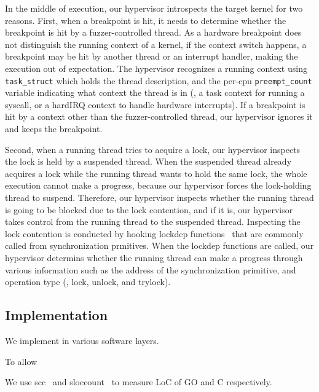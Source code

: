 %
%
In the middle of execution, our hypervisor introspects the target
kernel for two reasons.
%
First, when a breakpoint is hit, it needs to determine whether the
breakpoint is hit by a fuzzer-controlled thread.
%
As a hardware breakpoint does not distinguish the running context of a
kernel, if the context switch happens, a breakpoint may be hit by
another thread or an interrupt handler, making the execution out of
expectation.
%
The hypervisor recognizes a running context using \texttt{task_struct}
which holds the thread description, and the per-cpu
\texttt{preempt_count} variable indicating what context the thread is
in (\eg, a task context for running a syscall, or a hardIRQ context to
handle hardware interrupts).
%
If a breakpoint is hit by a context other than the fuzzer-controlled
thread, our hypervisor ignores it and keeps the breakpoint.

Second, when a running thread tries to acquire a lock, our hypervisor
inspects the lock is held by a suspended thread.
%
When the suspended thread already acquires a lock while the running
thread wants to hold the same lock, the whole execution cannot make a
progress, because our hypervisor forces the lock-holding thread to
suspend.
%
Therefore, our hypervisor inspects whether the running thread is going
to be blocked due to the lock contention, and if it is, our hypervisor
takes control from the running thread to the suspended thread.
%
Inspecting the lock contention is conducted by hooking lockdep
functions~\cite{lockdep} that are commonly called from synchronization
prmitives.
%
When the lockdep functions are called, our hypervisor determins
whether the running thread can make a progress through various
information such as the address of the synchronization primitive, and
operation type (\ie, lock, unlock, and trylock).


\subsection{Implementation}
\label{ss:impl}

We implement \sys in various software layers.
%

%
To allow 


We use scc~\cite{scc} and sloccount~\cite{sloccount} to measure LoC of
GO and C respectively.



